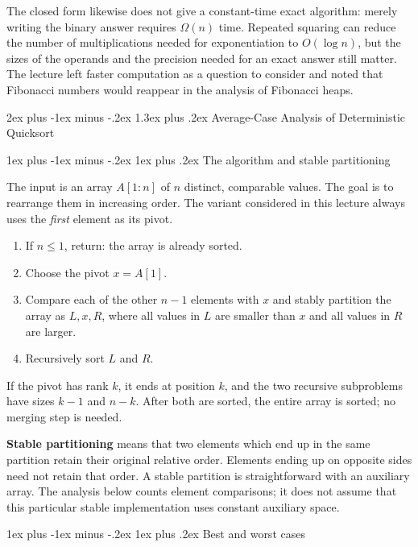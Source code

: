 \documentclass[11pt]{article}
\makeatletter
\renewcommand{\section}{\@startsection{section}{1}{0mm}%
                                   {2ex plus -1ex minus -.2ex}%
                                   {1.3ex plus .2ex}%
                                   {\normalfont\Large\bfseries}}%
\renewcommand{\subsection}{\@startsection{subsection}{2}{0mm}%
                                     {1ex plus -1ex minus -.2ex}%
                                     {1ex plus .2ex}%
                                     {\normalfont\large\bfseries}}%
\makeatother
\begin{document}
The closed form likewise does not give a constant-time exact algorithm:
merely writing the binary answer requires $\Omega(n)$ time. Repeated squaring
can reduce the number of multiplications needed for exponentiation to
$O(\log n)$, but the sizes of the operands and the precision needed for an exact
answer still matter. The lecture left faster computation as a question to
consider and noted that Fibonacci numbers would reappear in the analysis of
Fibonacci heaps.

\section{Average-Case Analysis of Deterministic Quicksort}

\subsection{The algorithm and stable partitioning}

The input is an array $A[1:n]$ of $n$ distinct, comparable values. The goal is
to rearrange them in increasing order. The variant considered in this lecture
always uses the \emph{first} element as its pivot.
\begin{enumerate}
 \item If $n\leq1$, return: the array is already sorted.
 \item Choose the pivot $x=A[1]$.
 \item Compare each of the other $n-1$ elements with $x$ and stably partition
 the array as $L,x,R$, where all values in $L$ are smaller than $x$ and all
 values in $R$ are larger.
 \item Recursively sort $L$ and $R$.
\end{enumerate}
If the pivot has rank $k$, it ends at position $k$, and the two recursive
subproblems have sizes $k-1$ and $n-k$. After both are sorted, the entire array
is sorted; no merging step is needed.

\textbf{Stable partitioning} means that two elements which end up in the same
partition retain their original relative order. Elements ending up on opposite
sides need not retain that order. A stable partition is straightforward with
an auxiliary array. The analysis below counts element comparisons; it does not
assume that this particular stable implementation uses constant auxiliary space.

\subsection{Best and worst cases}
\end{document}
